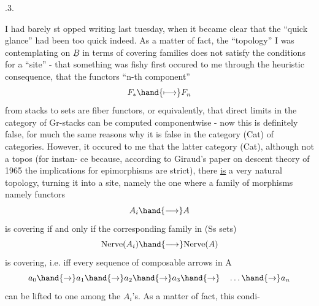 .3. 

 I had barely st opped writing last tuesday,  when it became clear 
that the ``quick glance'' had been too quick indeed.  As a matter
of fact,  the ``topology'' I was contemplating on $\underline{B}$ in terms of covering
families does not satisfy the conditions for a ``site'' -  that something
was fishy first occured to me through the heuristic consequence,  that
the functors  ``n-th component''
\[ F_{*} \hand{\longmapsto} F_{n} \]
from  stacks to sets are fiber functors,  or equivalently, that
direct limits in the category of Gr-stacks can be computed componentwise
-  now this is definitely false,  for much the same reasons why it is
false  in the category (Cat) of categories.  However,  it occured
to me that  the latter category (Cat),  although not a topos (for instan-%
ce because, according to Giraud's paper on descent theory of 1965
the implications for epimorphisms
are strict),  there \uline{is} a very natural topology,   turning it into
a site,  namely the one where a family of morphisms namely functors
\[ A_{i} \hand{\longrightarrow} A \]
is covering if and only if the corresponding family in (Ss sets)
\[ \mathrm{Nerve}(A_{i}) \hand{\longrightarrow} \mathrm{Nerve}(A) \]
is covering,  i.e. iff every  sequence of composable arrows in A
\[ a_{0} \hand{\to} a_{1} \hand{\to} a_{2} \hand{\to} a_{3} \hand{\to} \quad \dots \hand{\to} a_{n} \]
can be lifted  to one among the $A_{i}$'s.  As a matter of fact,  this condi-%
